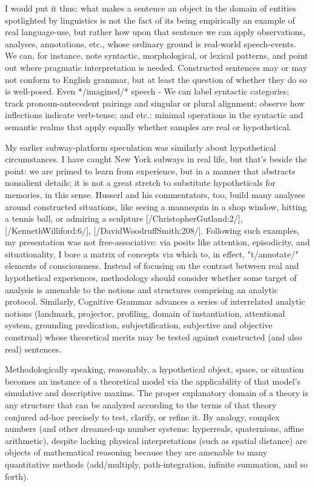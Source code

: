 I would put it thus: what makes a sentence an object in the 
domain of entities spotlighted by linguistics is not the 
fact of its being empirically an example of real language-use, but 
rather how upon that sentence we can apply observations, analyses, 
annotations, etc., whose ordinary ground is real-world 
speech-events.  We can, for instance, note syntactic, morphological, or lexical patterns, 
and point out where pragmatic interpretation is needed.  Constructed 
sentences may or may not conform to English grammar, 
but at least the question of whether they do so is 
well-posed.  Even */imagined/* speech 
-%
We can label syntactic categories; track 
pronoun-antecedent pairings and singular or plural alignment; observe
how inflections indicate verb-tense; and etc.: minimal operations in the
syntactic and semantic realms that apply equally
whether samples are real or hypothetical.

My earlier subway-platform speculation was similarly about hypothetical 
circumstances.  I have caught New York subways in real life, 
but that's beside the point: we are primed to learn from experience, 
but in a manner that abstracts nonsalient details; it is not a 
great stretch to substitute hypotheticals for memories, in this sense.
Husserl and his commentators, too, build many analyses around constructed situations, 
like seeing a mannequin in a shop window, hitting a tennis ball, 
or admiring a sculpture [/ChristopherGutland:2/], [/KennethWilliford:6/], 
[/DavidWoodruffSmith:208/].  Following such examples, my presentation 
was not free-associative: via posits 
like attention, episodicity, and situationality, I bore a matrix of 
concepts via which to, in effect, "t/annotate/" elements of consciousness.  
Instead of focusing on the contrast between real and hypothetical 
experiences, methodology should consider whether some target of 
analysis is amenable to the notions and structures comprising an 
analytic protocol.  Similarly, Cognitive Grammar advances a series of interrelated 
analytic notions (landmark, projector, profiling, domain of instantiation, 
attentional system, grounding predication, 
subjectification, subjective and objective construal) 
whose theoretical merits may be tested against constructed (and also real) sentences. 

Methodologically speaking, reasonably, a hypothetical object, space, or situation becomes 
an instance of a theoretical model via the applicability of 
that model's simulative and descriptive maxims.  The proper explanatory 
domain of a theory is any structure that can be analyzed 
according to the terms of that theory %
conjured ad-hoc precisely to test, clarify, or refine it.
By analogy, complex numbers (and other dreamed-up number systems: 
hyperreals, quaternions, affine arithmetic), despite  
lacking physical interpretations (such as spatial distance) 
are objects of mathematical reasoning because they are 
amenable to many quantitative methods (add/multiply, 
path-integration, infinite summation, and so forth).

